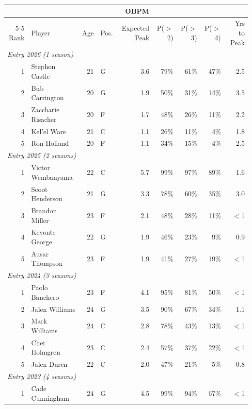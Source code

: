 \begin{table}[htbp]
  \centering\small
  \begin{tabular}{rlrlrrrrr}
    \toprule
     & & & & OBPM & & & & \\
    \cmidrule(lr){5-5}
    Rank & Player & Age & Pos. & Expected Peak & P($>$2) & P($>$3) & P($>$4) & Yrs to Peak \\
    \midrule
    \multicolumn{9}{l}{\textit{Entry 2026 (1 season)}} \\
    \midrule
    1 & Stephon Castle & 21 & G & 3.6 & 79\% & 61\% & 47\% & 2.5 \\
    2 & Bub Carrington & 20 & G & 1.9 & 50\% & 31\% & 14\% & 3.5 \\
    3 & Zaccharie Risacher & 20 & F & 1.7 & 48\% & 26\% & 11\% & 2.2 \\
    4 & Kel'el Ware & 21 & C & 1.1 & 26\% & 11\% & 4\% & 1.8 \\
    5 & Ron Holland & 20 & F & 1.1 & 34\% & 15\% & 4\% & 2.5 \\
    \midrule[0.4pt]
    \multicolumn{9}{l}{\textit{Entry 2025 (2 seasons)}} \\
    \midrule
    1 & Victor Wembanyama & 22 & C & 5.7 & 99\% & 97\% & 89\% & 1.6 \\
    2 & Scoot Henderson & 21 & G & 3.3 & 78\% & 60\% & 35\% & 3.0 \\
    3 & Brandon Miller & 23 & F & 2.1 & 48\% & 28\% & 11\% & $<$1 \\
    4 & Keyonte George & 22 & G & 1.9 & 46\% & 23\% & 9\% & 0.9 \\
    5 & Ausar Thompson & 23 & F & 1.9 & 41\% & 27\% & 19\% & $<$1 \\
    \midrule[0.4pt]
    \multicolumn{9}{l}{\textit{Entry 2024 (3 seasons)}} \\
    \midrule
    1 & Paolo Banchero & 23 & F & 4.1 & 95\% & 81\% & 50\% & $<$1 \\
    2 & Jalen Williams & 24 & G & 3.5 & 90\% & 67\% & 34\% & 1.1 \\
    3 & Mark Williams & 24 & C & 2.8 & 78\% & 43\% & 13\% & $<$1 \\
    4 & Chet Holmgren & 23 & C & 2.4 & 57\% & 37\% & 22\% & $<$1 \\
    5 & Jalen Duren & 22 & C & 2.0 & 47\% & 21\% & 5\% & 0.8 \\
    \midrule[0.4pt]
    \multicolumn{9}{l}{\textit{Entry 2023 (4 seasons)}} \\
    \midrule
    1 & Cade Cunningham & 24 & G & 4.5 & 99\% & 94\% & 67\% & $<$1 \\

\end{tabular}
\end{table}

